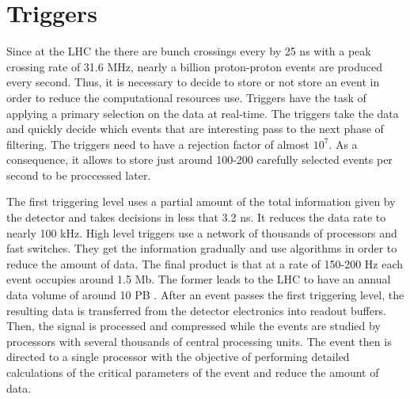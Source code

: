 \section{Triggers}

Since at the LHC the there are bunch crossings every by 25 ns with a peak crossing rate of 31.6 MHz, nearly a billion proton-proton events are produced every second. Thus, it is necessary to decide
to store or not store an event in order to reduce the computational resources use. Triggers have the task of applying a primary selection on the data at real-time. The triggers take the data and quickly 
decide which events that are interesting pass to the next phase of filtering. The triggers need to have a rejection factor of almost $10^7$. As a consequence, it allows to store just around 100-200 
carefully selected events per second to be proccessed later. 

The first triggering level uses a partial amount of the total information given by the detector and takes decisions in less that 3.2 ns. 
It reduces the data rate to nearly 100 kHz. High level triggers use a network of thousands of processors and fast switches. They get the information gradually and use algorithms in order to reduce 
the amount of data. The final product is that at a rate of 150-200 Hz each event occupies around 1.5 Mb. The former leads to the LHC to have an annual data volume of around 10 PB . After an event 
passes the first triggering level, the resulting data is transferred from the detector electronics into readout buffers. Then, the signal is processed and compressed while the events are studied by 
processors with several thousands of central processing units. The event then is directed to a single processor with the objective of performing detailed calculations of the critical parameters of the 
event and reduce the amount of data.






